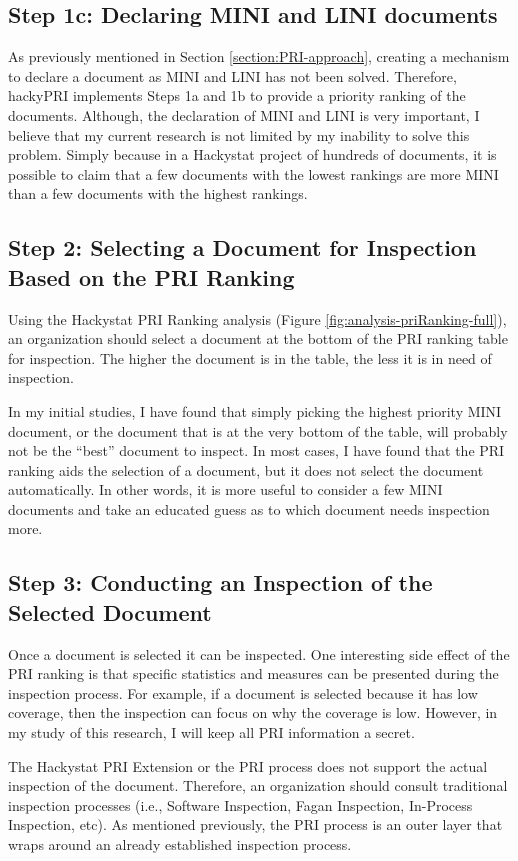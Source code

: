 \subsection{Step 1c: Declaring MINI and LINI documents}
As previously mentioned in Section \ref{section:PRI-approach}, creating a
mechanism to declare a document as MINI and LINI has not been solved.
Therefore, hackyPRI implements Steps 1a and 1b to provide a priority
ranking of the documents. Although, the declaration of MINI and LINI is
very important, I believe that my current research is not limited by my
inability to solve this problem. Simply because in a Hackystat project of
hundreds of documents, it is possible to claim that a few documents with
the lowest rankings are more MINI than a few documents with the highest
rankings.


\subsection{Step 2: Selecting a Document for Inspection Based on the PRI
  Ranking} Using the Hackystat PRI Ranking analysis (Figure
\ref{fig:analysis-priRanking-full}), an organization should select a
document at the bottom of the PRI ranking table for inspection. The higher
the document is in the table, the less it is in need of inspection.

In my initial studies, I have found that simply picking the highest
priority MINI document, or the document that is at the very bottom of the
table, will probably not be the ``best'' document to inspect. In most
cases, I have found that the PRI ranking aids the selection of a document,
but it does not select the document automatically. In other words, it is
more useful to consider a few MINI documents and take an educated guess as
to which document needs inspection more.

\subsection{Step 3: Conducting an Inspection of the Selected Document}
Once a document is selected it can be inspected. One interesting side
effect of the PRI ranking is that specific statistics and measures can be
presented during the inspection process. For example, if a document is
selected because it has low coverage, then the inspection can focus on why
the coverage is low. However, in my study of this research, I will keep all
PRI information a secret.

The Hackystat PRI Extension or the PRI process does not support the actual
inspection of the document. Therefore, an organization should consult
traditional inspection processes (i.e., Software Inspection, Fagan
Inspection, In-Process Inspection, etc). As mentioned previously, the PRI
process is an outer layer that wraps around an already established
inspection process.

